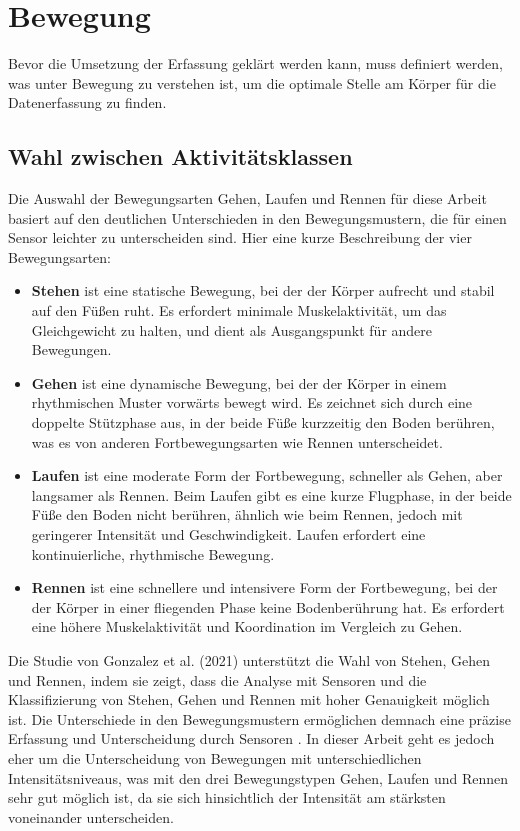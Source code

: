 \chapter{Bewegung}
Bevor die Umsetzung der Erfassung geklärt werden kann, muss definiert werden, was unter Bewegung zu verstehen ist, um die optimale Stelle am Körper für die Datenerfassung zu finden.

\section{Wahl zwischen Aktivitätsklassen}
Die Auswahl der Bewegungsarten Gehen, Laufen und Rennen für diese Arbeit basiert auf den deutlichen Unterschieden in den Bewegungsmustern, die für einen Sensor leichter zu unterscheiden sind. Hier eine kurze Beschreibung der vier Bewegungsarten:

\begin{itemize}
	\item \textbf{Stehen} ist eine statische Bewegung, bei der der Körper aufrecht und stabil auf den Füßen ruht. Es erfordert minimale Muskelaktivität, um das Gleichgewicht zu halten, und dient als Ausgangspunkt für andere Bewegungen.
	\item \textbf{Gehen} ist eine dynamische Bewegung, bei der der Körper in einem rhythmischen Muster vorwärts bewegt wird. Es zeichnet sich durch eine doppelte Stützphase aus, in der beide Füße kurzzeitig den Boden berühren, was es von anderen Fortbewegungsarten wie Rennen unterscheidet.
	\item \textbf{Laufen} ist eine moderate Form der Fortbewegung, schneller als Gehen, aber langsamer als Rennen. Beim Laufen gibt es eine kurze Flugphase, in der beide Füße den Boden nicht berühren, ähnlich wie beim Rennen, jedoch mit geringerer Intensität und Geschwindigkeit. Laufen erfordert eine kontinuierliche, rhythmische Bewegung.
	\item \textbf{Rennen} ist eine schnellere und intensivere Form der Fortbewegung, bei der der Körper in einer fliegenden Phase keine Bodenberührung hat. Es erfordert eine höhere Muskelaktivität und Koordination im Vergleich zu Gehen.
\end{itemize}

Die Studie von Gonzalez et al. (2021) unterstützt die Wahl von Stehen, Gehen und Rennen, indem sie zeigt, dass die Analyse mit Sensoren und die Klassifizierung von Stehen, Gehen und Rennen mit hoher Genauigkeit möglich ist. Die Unterschiede in den Bewegungsmustern ermöglichen demnach eine präzise Erfassung und Unterscheidung durch Sensoren \cite{gonzalez2020ablation}. In dieser Arbeit geht es jedoch eher um die Unterscheidung von Bewegungen mit unterschiedlichen Intensitätsniveaus, was mit den drei Bewegungstypen Gehen, Laufen und Rennen sehr gut möglich ist, da sie sich hinsichtlich der Intensität am stärksten voneinander unterscheiden.

